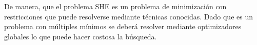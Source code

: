 De manera, que el problema SHE es un problema de minimización con restricciones que puede resolverse mediante técnicas conocidas. Dado que es un problema con múltiples mínimos se deberá resolver mediante optimizadores globales lo que puede hacer costosa la búsqueda.





